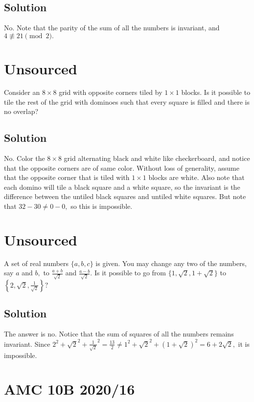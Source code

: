 \documentclass{article}
\begin{document}
\subsection{Solution}

No. Note that the parity of the sum of all the numbers is invariant, and $4\not\equiv21\pmod{2}.$

\pagebreak\section{Unsourced}

Consider an $8\times 8$ grid with opposite corners tiled by $1\times 1$ blocks. Is it possible to tile the rest of the grid with dominoes such that every square is filled and there is no overlap?

\subsection{Solution}

No. Color the $8\times 8$ grid alternating black and white like checkerboard, and notice that the opposite corners are of same color. Without loss of generality, assume that the opposite corner that is tiled with $1\times 1$ blocks are white. Also note that each domino will tile a black square and a white square, so the invariant is the difference between the untiled black squares and untiled white squares. But note that $32-30\neq 0-0,$ so this is impossible.

\pagebreak\section{Unsourced}

A set of real numbers $\{a, b, c\}$ is given. You may change any two of the numbers, say $a$ and $b,$ to $\frac{a+b}{\sqrt{2}}$ and $\frac{a-b}{\sqrt{2}} .$ Is it possible to go from $\{1, \sqrt{2}, 1+\sqrt{2}\}$ to $\left\{2, \sqrt{2}, \frac{1}{\sqrt{2}}\right\} ?$

\subsection{Solution}

The answer is no. Notice that the sum of squares of all the numbers remains invariant. Since $2^2+ \sqrt{2}^2 + \frac{1}{\sqrt{2}}^2 = \frac{13}{2} \neq 1^2 + \sqrt{2}^2 + \left(1+\sqrt{2}\right)^2 = 6+2\sqrt{2},$ it is impossible.

\pagebreak\section{AMC 10B 2020/16}
\end{document}
